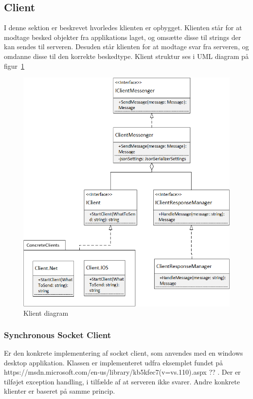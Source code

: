 \subsection{Client}
I denne sektion er beskrevet hvorledes klienten er opbygget. Klienten står for at modtage besked objekter fra applikations laget, og omsætte disse til strings der kan sendes til serveren. Desuden står klienten for at modtage svar fra serveren, og omdanne disse til den korrekte beskedtype. Klient struktur ses i UML diagram på figur~\ref{fig:ConnectionClient}

\begin{figure}
	\centering
	\includegraphics[width=0.9\linewidth]{figs/connection/ConnectionClient.png}
	\caption{Klient diagram}
	\label{fig:ConnectionClient}
\end{figure}

\subsubsection{Synchronous Socket Client}
Er den konkrete implementering af socket client, som anvendes med en windows desktop applikation. Klassen er implementeret udfra eksemplet fundet på https://msdn.microsoft.com/en-us/library/kb5kfec7(v=vs.110).aspx ?? . Der er tilføjet exception handling, i tilfælde af at serveren ikke svarer. Andre konkrete klienter er baseret på samme princip.

